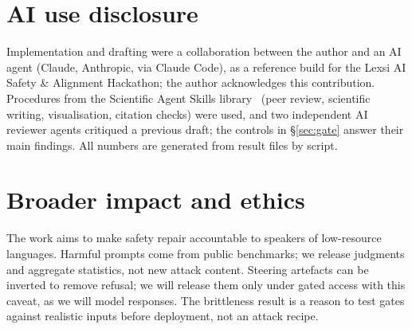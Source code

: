 \documentclass{article}
\begin{document}
\section*{AI use disclosure}
Implementation and drafting were a collaboration between the author and an AI agent (Claude, Anthropic, via Claude Code), as a reference build for the Lexsi AI Safety \& Alignment Hackathon; the author acknowledges this contribution. Procedures from the Scientific Agent Skills library~\citep{kassis2026skills} (peer review, scientific writing, visualisation, citation checks) were used, and two independent AI reviewer agents critiqued a previous draft; the controls in \S\ref{sec:gate} answer their main findings. All numbers are generated from result files by script.

\section*{Broader impact and ethics}
The work aims to make safety repair accountable to speakers of low-resource languages. Harmful prompts come from public benchmarks; we release judgments and aggregate statistics, not new attack content. Steering artefacts can be inverted to remove refusal; we will release them only under gated access with this caveat, as we will model responses. The brittleness result is a reason to test gates against realistic inputs before deployment, not an attack recipe.




\appendix
\end{document}
